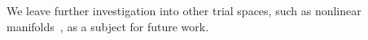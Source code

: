We leave further investigation into other trial spaces, such as nonlinear manifolds~\cite{leeCarlberg}, as a subject for future work.
